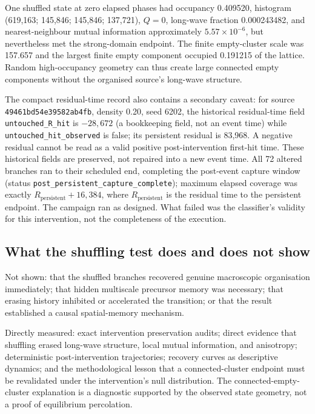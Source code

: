 \documentclass[11pt,a4paper]{article}
\newcommand{\code}[1]{\texttt{#1}}
\begin{document}
\begin{table}[h]
\centering
\caption{Compact audit establishing endpoint failure.}
\resizebox{\linewidth}{!}{}
\end{table}

One shuffled state at zero elapsed phases had occupancy 0.409520, histogram (619,163; 145,846; 145,846; 137,721), $Q=0$, long-wave fraction 0.000243482, and nearest-neighbour mutual information approximately $5.57\times10^{-6}$, but nevertheless met the strong-domain endpoint. The finite empty-cluster scale was 157.657 and the largest finite empty component occupied 0.191215 of the lattice. Random high-occupancy geometry can thus create large connected empty components without the organised source's long-wave structure.

\begingroup\sloppy The compact residual-time record also contains a secondary caveat: for source \code{49461bd54e39582ab4fb}, density 0.20, seed 6202, the historical residual-time field \code{untouched\_R\_hit} is $-28,672$ (a bookkeeping field, not an event time) while \code{untouched\_hit\_observed} is false; its persistent residual is 83,968. A negative residual cannot be read as a valid positive post-intervention first-hit time. These historical fields are preserved, not repaired into a new event time. All 72 altered branches ran to their scheduled end, completing the post-event capture window (status \code{post\_persistent\_capture\_complete}); maximum elapsed coverage was exactly $R_{\mathrm{persistent}}+16,384$, where $R_{\mathrm{persistent}}$ is the residual time to the persistent endpoint. The campaign ran as designed. What failed was the classifier's validity for this intervention, not the completeness of the execution.\par\endgroup

\subsection{What the shuffling test does and does not show}
Not shown: that the shuffled branches recovered genuine macroscopic organisation immediately; that hidden multiscale precursor memory was necessary; that erasing history inhibited or accelerated the transition; or that the result established a causal spatial-memory mechanism.

\begingroup\sloppy Directly measured: exact intervention preservation audits; direct evidence that shuffling erased long-wave structure, local mutual information, and anisotropy; deterministic post-intervention trajectories; recovery curves as descriptive dynamics; and the methodological lesson that a connected-cluster endpoint must be revalidated under the intervention's null distribution. The connected-empty-cluster explanation is a diagnostic supported by the observed state geometry, not a proof of equilibrium percolation.\par\endgroup
\end{document}
